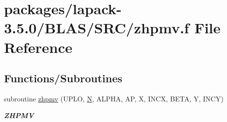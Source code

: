 \hypertarget{lapack-3_85_80_2BLAS_2SRC_2zhpmv_8f}{}\section{packages/lapack-\/3.5.0/\+B\+L\+A\+S/\+S\+R\+C/zhpmv.f File Reference}
\label{lapack-3_85_80_2BLAS_2SRC_2zhpmv_8f}
\subsection*{Functions/\+Subroutines}
\begin{DoxyCompactItemize}
\item 
subroutine \hyperlink{group__complex16__blas__level2_gad4a66a9d545e2f11dd6ca5a666cc5316}{zhpmv} (U\+P\+L\+O, \hyperlink{polmisc_8c_a0240ac851181b84ac374872dc5434ee4}{N}, A\+L\+P\+H\+A, A\+P, X, I\+N\+C\+X, B\+E\+T\+A, Y, I\+N\+C\+Y)
\begin{DoxyCompactList}\small\item\em {\bfseries Z\+H\+P\+M\+V} \end{DoxyCompactList}\end{DoxyCompactItemize}
